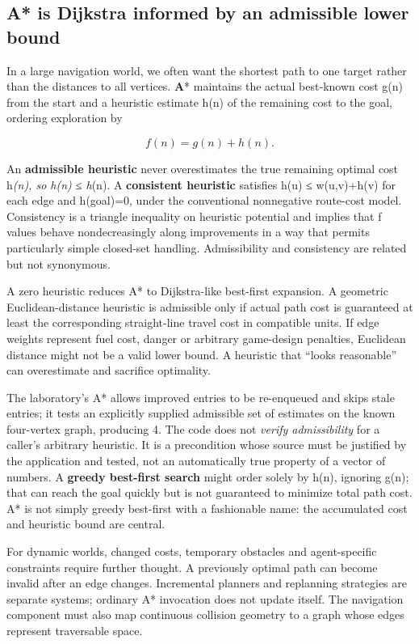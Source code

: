 \subsection{A* is Dijkstra informed by an admissible lower bound}\label{05-engine-i-ch008-a-is-dijkstra-informed-by-an-admissible-lower-bound}

In a large navigation world, we often want the shortest path to one target rather than the distances to all vertices. \textbf{A}* maintains the actual best-known cost g(n) from the start and a heuristic estimate h(n) of the remaining cost to the goal, ordering exploration by

\[
f(n)=g(n)+h(n).
\]

An \textbf{admissible heuristic} never overestimates the true remaining optimal cost h\emph{(n), so h(n) ≤ h}(n). A \textbf{consistent heuristic} satisfies h(u) ≤ w(u,v)+h(v) for each edge and h(goal)=0, under the conventional nonnegative route-cost model. Consistency is a triangle inequality on heuristic potential and implies that f values behave nondecreasingly along improvements in a way that permits particularly simple closed-set handling. Admissibility and consistency are related but not synonymous.

A zero heuristic reduces A* to Dijkstra-like best-first expansion. A geometric Euclidean-distance heuristic is admissible only if actual path cost is guaranteed at least the corresponding straight-line travel cost in compatible units. If edge weights represent fuel cost, danger or arbitrary game-design penalties, Euclidean distance might not be a valid lower bound. A heuristic that ``looks reasonable'' can overestimate and sacrifice optimality.

The laboratory's A* allows improved entries to be re-enqueued and skips stale entries; it tests an explicitly supplied admissible set of estimates on the known four-vertex graph, producing 4. The code does not \emph{verify admissibility} for a caller's arbitrary heuristic. It is a precondition whose source must be justified by the application and tested, not an automatically true property of a vector of numbers. A \textbf{greedy best-first search} might order solely by h(n), ignoring g(n); that can reach the goal quickly but is not guaranteed to minimize total path cost. A* is not simply greedy best-first with a fashionable name: the accumulated cost and heuristic bound are central.

For dynamic worlds, changed costs, temporary obstacles and agent-specific constraints require further thought. A previously optimal path can become invalid after an edge changes. Incremental planners and replanning strategies are separate systems; ordinary A* invocation does not update itself. The navigation component must also map continuous collision geometry to a graph whose edges represent traversable space.

